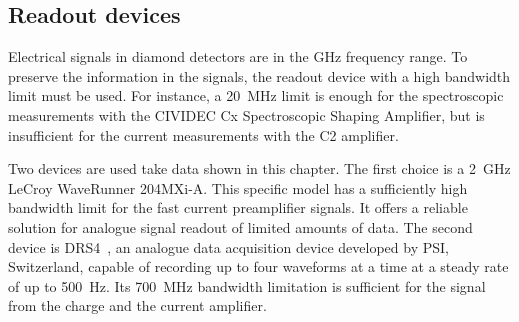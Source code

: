 \subsection{Readout devices}
\label{sec:readoutdev}
Electrical signals in diamond detectors are in the GHz frequency range. To preserve the information in the signals, the readout device with a high bandwidth limit must be used. For instance, a 20~MHz limit is enough for the spectroscopic measurements with the CIVIDEC Cx Spectroscopic Shaping Amplifier, but is insufficient for the current measurements with the C2 amplifier. 

Two devices are used take data shown in this chapter. The first choice is a 2~GHz LeCroy WaveRunner 204MXi-A. This specific model has a sufficiently high bandwidth limit for the fast current preamplifier signals. It offers a reliable solution for analogue signal readout of limited amounts of data. 
The second device is DRS4~\cite{DRS4:00000}, an analogue data acquisition device developed by PSI, Switzerland, capable of recording up to four waveforms at a time at a steady rate of up to 500~Hz. Its 700~MHz bandwidth limitation is sufficient for the signal from the charge and the current amplifier.



